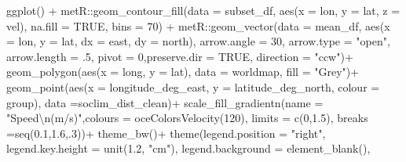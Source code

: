 \documentclass[
]{article}
\newenvironment{Shaded}{\begin{snugshade}}{\end{snugshade}}
\newcommand{\AttributeTok}[1]{\textcolor[rgb]{0.77,0.63,0.00}{#1}}
\newcommand{\ConstantTok}[1]{\textcolor[rgb]{0.00,0.00,0.00}{#1}}
\newcommand{\DecValTok}[1]{\textcolor[rgb]{0.00,0.00,0.81}{#1}}
\newcommand{\FloatTok}[1]{\textcolor[rgb]{0.00,0.00,0.81}{#1}}
\newcommand{\FunctionTok}[1]{\textcolor[rgb]{0.00,0.00,0.00}{#1}}
\newcommand{\NormalTok}[1]{#1}
\newcommand{\SpecialCharTok}[1]{\textcolor[rgb]{0.00,0.00,0.00}{#1}}
\newcommand{\StringTok}[1]{\textcolor[rgb]{0.31,0.60,0.02}{#1}}
\begin{document}
\begin{Shaded}
\begin{Highlighting}[]
\FunctionTok{ggplot}\NormalTok{() }\SpecialCharTok{+}
\NormalTok{  metR}\SpecialCharTok{::}\FunctionTok{geom\_contour\_fill}\NormalTok{(}\AttributeTok{data =}\NormalTok{ subset\_df, }\FunctionTok{aes}\NormalTok{(}\AttributeTok{x =}\NormalTok{ lon, }\AttributeTok{y =}\NormalTok{ lat, }\AttributeTok{z =}\NormalTok{ vel), }\AttributeTok{na.fill =} \ConstantTok{TRUE}\NormalTok{, }\AttributeTok{bins =} \DecValTok{70}\NormalTok{) }\SpecialCharTok{+} 
\NormalTok{  metR}\SpecialCharTok{::}\FunctionTok{geom\_vector}\NormalTok{(}\AttributeTok{data =}\NormalTok{ mean\_df, }\FunctionTok{aes}\NormalTok{(}\AttributeTok{x =}\NormalTok{ lon, }\AttributeTok{y =}\NormalTok{ lat, }\AttributeTok{dx =}\NormalTok{ east, }\AttributeTok{dy =}\NormalTok{ north), }
                    \AttributeTok{arrow.angle =} \DecValTok{30}\NormalTok{, }\AttributeTok{arrow.type =} \StringTok{"open"}\NormalTok{, }\AttributeTok{arrow.length =}\NormalTok{ .}\DecValTok{5}\NormalTok{, }
                    \AttributeTok{pivot =} \DecValTok{0}\NormalTok{,}\AttributeTok{preserve.dir =} \ConstantTok{TRUE}\NormalTok{, }\AttributeTok{direction =} \StringTok{"ccw"}\NormalTok{)}\SpecialCharTok{+}
  \FunctionTok{geom\_polygon}\NormalTok{(}\FunctionTok{aes}\NormalTok{(}\AttributeTok{x =}\NormalTok{ long, }\AttributeTok{y =}\NormalTok{ lat), }\AttributeTok{data =}\NormalTok{ worldmap, }\AttributeTok{fill =} \StringTok{"Grey"}\NormalTok{)}\SpecialCharTok{+}
  \FunctionTok{geom\_point}\NormalTok{(}\FunctionTok{aes}\NormalTok{(}\AttributeTok{x =}\NormalTok{ longitude\_deg\_east, }\AttributeTok{y =}\NormalTok{ latitude\_deg\_north, }\AttributeTok{colour =}\NormalTok{ group), }\AttributeTok{data =}\NormalTok{soclim\_dist\_clean)}\SpecialCharTok{+}
  \FunctionTok{scale\_fill\_gradientn}\NormalTok{(}\AttributeTok{name =} \StringTok{"Speed}\SpecialCharTok{\textbackslash{}n}\StringTok{(m/s)"}\NormalTok{,}\AttributeTok{colours =} \FunctionTok{oceColorsVelocity}\NormalTok{(}\DecValTok{120}\NormalTok{), }
                       \AttributeTok{limits =} \FunctionTok{c}\NormalTok{(}\DecValTok{0}\NormalTok{,}\FloatTok{1.5}\NormalTok{), }\AttributeTok{breaks =}\FunctionTok{seq}\NormalTok{(}\FloatTok{0.1}\NormalTok{,}\FloatTok{1.6}\NormalTok{,.}\DecValTok{3}\NormalTok{))}\SpecialCharTok{+}
  \FunctionTok{theme\_bw}\NormalTok{()}\SpecialCharTok{+}
  \FunctionTok{theme}\NormalTok{(}\AttributeTok{legend.position =} \StringTok{"right"}\NormalTok{,}
        \AttributeTok{legend.key.height =} \FunctionTok{unit}\NormalTok{(}\FloatTok{1.2}\NormalTok{, }\StringTok{"cm"}\NormalTok{), }
        \AttributeTok{legend.background =} \FunctionTok{element\_blank}\NormalTok{(),}

\end{Highlighting}
\end{Shaded}
\end{document}

